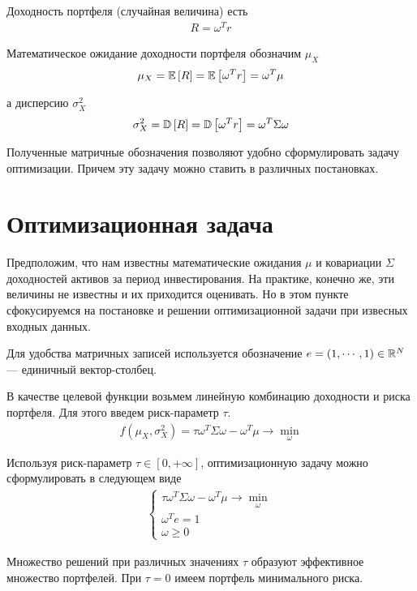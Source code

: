 Доходность портфеля (случайная величина) есть
\begin{align}
	R = \omega^T r
\end{align}

Математическое ожидание доходности портфеля обозначим $\mu_X$
\begin{align}
	\mu_X = \mathbb{E}\left[R\right] = \mathbb{E}\left[\omega^T r\right] = \omega^T \mu
\end{align}

а дисперсию $\sigma_X^2$
\begin{align}
	\sigma_X^2 = \mathbb{D}\left[R\right] = \mathbb{D}\left[\omega^T r\right] = \omega^T \Sigma \omega
\end{align}

Полученные матричные обозначения позволяют удобно сформулировать задачу оптимизации.
Причем эту задачу можно ставить в различных постановках.

\section{Оптимизационная задача}

Предположим, что нам известны математические ожидания $\mu$ и ковариации $\Sigma$ доходностей активов за период инвестирования.
На практике, конечно же, эти величины не известны и их приходится оценивать. Но в этом пункте сфокусируемся
на постановке и решении оптимизационной задачи при извесных входных данных.

Для удобства матричных записей используется обозначение $e = (1, \cdots, 1) \in \mathbb{R}^N$ --- единичный вектор-столбец.


В качестве целевой функции возьмем линейную комбинацию доходности и риска портфеля. Для этого введем риск-параметр $\tau$.
\begin{align}
	f\left(\mu_X, \sigma_X^2 \right) = \tau \omega^T \Sigma \omega - \omega^T \mu \rightarrow \min_{\omega}
\end{align}

Используя риск-параметр $\tau \in [0, +\infty]$, оптимизационную задачу можно сформулировать в следующем виде
\begin{align}
	\begin{cases}
		\tau \omega^T \Sigma \omega - \omega^T \mu \rightarrow \min_{\omega} \\
		\omega^T e = 1 \\
		\omega \ge 0
	\end{cases}
\end{align}

Множество решений при различных значениях $\tau$ образуют эффективное множество портфелей.
При $\tau = 0$ имеем портфель минимального риска.

